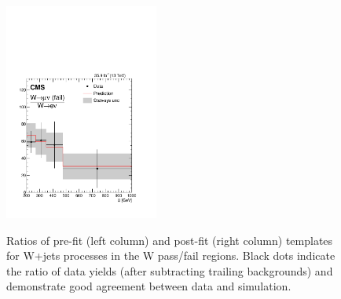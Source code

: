 \begin{figure}
\includegraphics[width=0.45\textwidth]{figures/pullsImpact/ratio_wmn_fail_wen_shapes_fit_b.pdf}\\
\caption{Ratios of pre-fit (left column) and post-fit (right column) templates for W+jets processes in the W pass/fail regions. Black dots indicate the ratio of data yields (after subtracting trailing backgrounds) and demonstrate good agreement between data and simulation.}
\label{wwratios}
\end{figure}

\clearpage

